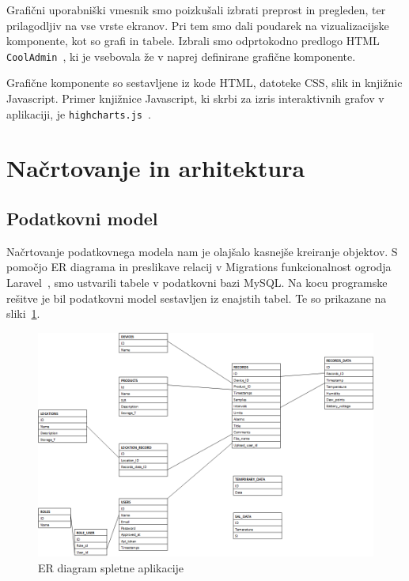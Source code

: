 \documentclass[a4paper, 12pt]{book}
\begin{document}
Grafični uporabniški vmesnik smo poizkušali izbrati preprost in pregleden, ter prilagodljiv na vse vrste ekranov. Pri tem smo dali poudarek na vizualizacijske komponente, kot so grafi in tabele. Izbrali smo odprtokodno predlogo HTML {\tt CoolAdmin}~\cite{cooladmin-html-template}, ki je vsebovala že v naprej definirane grafične komponente.

Grafične komponente so sestavljene iz kode HTML, datoteke CSS, slik in knjižnic Javascript.
Primer knjižnice Javascript, ki skrbi za izris interaktivnih grafov v aplikaciji, je {\tt highcharts.js}~\cite{hightchars-js}.




\section{Načrtovanje in arhitektura}

\subsection{Podatkovni model}

Načrtovanje podatkovnega modela nam je olajšalo kasnejše kreiranje objektov. S pomočjo ER diagrama in preslikave relacij v Migrations funkcionalnost ogrodja Laravel~\cite{laravel-migrations}, smo ustvarili tabele v podatkovni bazi MySQL. Na kocu programske rešitve je bil podatkovni model sestavljen iz enajstih tabel. Te so prikazane na sliki~\ref{database-model}.

\begin{figure}[t]
\begin{center}
\includegraphics[width=\textwidth]{slike/database_model-updated-for-diploma-1.png}
\end{center}
\caption{ER diagram spletne aplikacije}
\label{database-model}
\end{figure}
\end{document}
